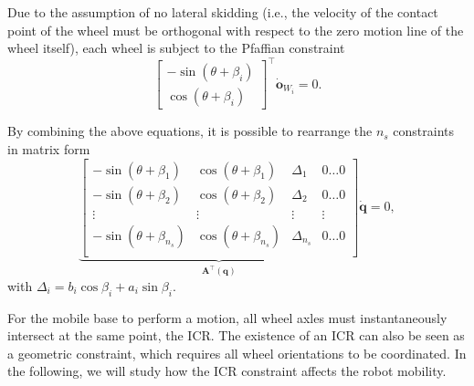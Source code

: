 Due to the assumption of no lateral skidding (i.e., the velocity of the contact
point of the wheel must be orthogonal with respect to the zero motion line of
the wheel itself), each wheel is subject to the Pfaffian constraint
\begin{equation}
    \label{eq:no-lateral-skidding-constraint}
    \begin{bmatrix}
        -\sin(\theta + \beta_i) \\
         \cos(\theta + \beta_i)
    \end{bmatrix}^\top \dot{\bm{o}}_{W_i} = 0.
\end{equation}

By combining the above equations, it is possible to rearrange the $n_s$ constraints in matrix form
\begin{equation}
    \label{eq:pfaffian-constraints-matrix-form}
    \underbrace{
    \begin{bmatrix}
        -\sin(\theta + \beta_1) &
        \cos(\theta + \beta_1) &
        \Delta_1 &
        0 \dots 0 \\
        -\sin(\theta + \beta_2) &
        \cos(\theta + \beta_2) &
        \Delta_2 &
        0 \dots 0 \\
        \vdots & \vdots & \vdots & \vdots \\
        -\sin(\theta + \beta_{n_s}) &
        \cos(\theta + \beta_{n_s}) &
        \Delta_{n_s} &
        0 \dots 0 \\
    \end{bmatrix}
    }_{\bm{A}^\top(\bm{q})}
    \dot{\bm{q}} = 0,
\end{equation}
with $\Delta_i = b_i \cos\beta_i + a_i \sin\beta_i$.

For the mobile base to perform a motion, all wheel axles must instantaneously
intersect at the same point, the ICR. The existence of an ICR can also be seen
as a geometric constraint, which requires all wheel orientations to be
coordinated. In the following, we will study how the ICR constraint affects
the robot mobility.

